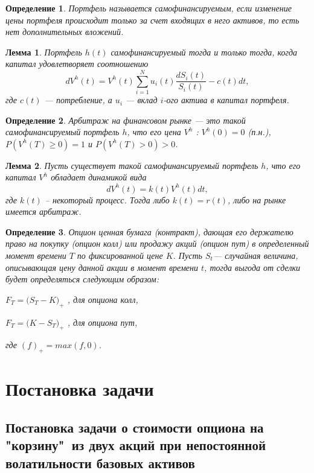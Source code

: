 \documentclass[a4paper, 12pt]{extreport}
\newtheorem{lemma}{Лемма}
\newtheorem{definition}{Определение}
\numberwithin{equation}{section}
\begin{document}
	\begin{definition}
		Портфель называется самофинансируемым, если изменение цены портфеля происходит только за счет входящих в него активов, то есть нет дополнительных вложений. 
	\end{definition}
	
	\begin{lemma}
		Портфель $h(t)$ самофинансируемый тогда и только тогда, когда капитал удовлетворяет соотношению
	 	$$dV^h(t)=V^h(t)\sum_{i=1}^{N}u_i(t)\frac{dS_i(t)}{S_i(t)}-c(t)dt,$$
	 	где $c(t)$ --- потребление, а $u_i$ --- вклад $i$-ого актива в капитал портфеля.
	\end{lemma}
	
	
	\begin{definition}
		Арбитраж на финансовом рынке --- это такой самофинансируемый портфель $h$, что его цена $V^h$ :
		$V^h(0)=0$ (п.н.), $P(V^h(T) \geqslant 0)=1$ и $P(V^h(T) > 0)>0$. 
	\end{definition}	
	
	
	\begin{lemma}
		Пусть существует такой самофинансируемый портфель $h$, что его капитал $V^h$ обладает динамикой вида   $$dV^h(t)=k(t)V^h(t)dt,$$ где $k(t)$ -- некоторый процесс. Тогда либо $k(t)=r(t)$, либо на рынке имеется арбитраж.
	\end{lemma}
	
	
	\begin{definition}
		Опцион ценная бумага (контракт), дающая его держателю право на покупку (опцион колл) или продажу акций (опцион пут) в определенный момент времени $T$ по фиксированной цене $K$. Пусть $S_t$--- случайная величина, описывающая цену данной акции в момент времени $t$, тогда выгода от сделки будет определяться следующим образом:
		\begin{center}
	
		$F_T=\bigl(S_T-K\bigr)_+$ ,  для опциона колл,
		
		
		$F_T=\bigl(K-S_T\bigr)_+$ ,  для опциона пут,
		\end{center}
		где $(f)_{+}=max(f,0)$.
	\end{definition}
	
	\newpage
	\chapter{Постановка задачи}
	\section{Постановка задачи о стоимости опциона на "корзину"\ из двух акций при непостоянной волатильности базовых активов}
	
\end{document}
